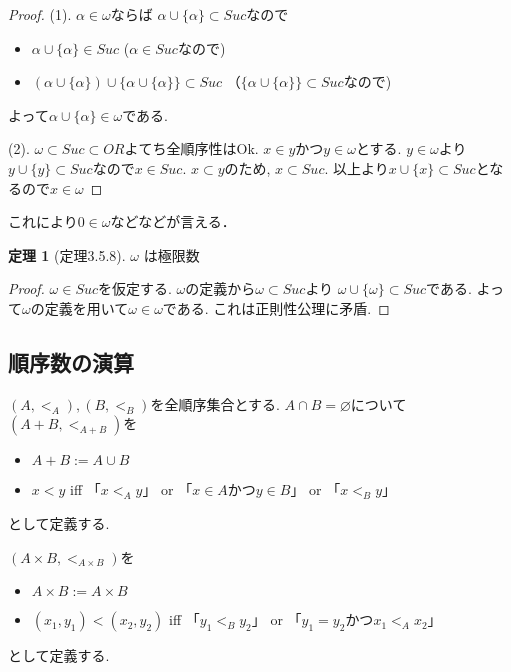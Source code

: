 \documentclass[dvipdfmx,a4paper,11pt]{article}
\theoremstyle{definition}
\newtheorem{thm}{定理}
\begin{document}
\begin{proof}
(1). $\alpha \in \omega$ならば
$\alpha  \cup \{ \alpha \} \subset Suc $なので
\begin{itemize}
\item $\alpha  \cup \{ \alpha \}  \in Suc $ ($\alpha \in Suc$なので)
\item $(\alpha  \cup \{ \alpha \} ) \cup \{ \alpha  \cup \{ \alpha \} \}  \subset Suc $ （$\{ \alpha  \cup \{ \alpha \} \} \subset Suc$なので)
\end{itemize}
よって$\alpha  \cup \{ \alpha \}  \in \omega$である. 

(2). $\omega \subset Suc \subset OR$よてち全順序性はOk.
$x \in y$かつ$y \in \omega$とする. 
$y \in \omega$より$y \cup \{ y\}\subset Suc$なので$x \in Suc$.
$x \subset y$のため, $x \subset Suc$.
以上より$x \cup \{ x\} \subset Suc$となるので$x \in \omega $
\end{proof}

これにより$0 \in \omega$などなどが言える． 

 \begin{tcolorbox}
 [colback = white, colframe = green!35!black, fonttitle = \bfseries,breakable = true]
\begin{thm}[定理3.5.8]
$\omega$ は極限数
\end{thm}
\end{tcolorbox}
\begin{proof}
$\omega \in Suc$を仮定する. 
$\omega$の定義から$\omega \subset Suc$より
$\omega \cup \{ \omega\} \subset Suc$である.
よって$\omega$の定義を用いて$\omega \in \omega$である.
これは正則性公理に矛盾. 
\end{proof}

\subsection{順序数の演算}

 \begin{tcolorbox}
 [colback = white, colframe = green!35!black, fonttitle = \bfseries,breakable = true]
$(A,<_A), (B,<_B)$を全順序集合とする.
$A \cap B=\varnothing$について
$(A+B,<_{A+B})$を
\begin{itemize}
\item $A + B := A \cup B$
\item $x < y$ iff 「$x<_A y$」 or 「$x \in A$かつ$y \in B$」 or 「$x<_B y$」
\end{itemize}
として定義する.


$(A \times B,<_{A \times B})$を
\begin{itemize}
\item $A  \times B := A \times  B$
\item $(x_1, y_1) < (x_2, y_2)$ iff 
「$y_1<_B y_2$」 or 「$y_1 = y_2$かつ$x_1<_A x_2$」
\end{itemize}
として定義する.
\end{tcolorbox}
\end{document}
